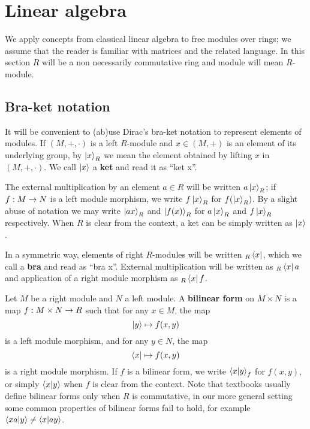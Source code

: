 \section{Linear algebra}
\label{sec:linear-algebra}

We apply concepts from classical linear algebra to free modules over
rings; we assume that the reader is familiar with matrices and the
related language. In this section $R$ will be a non necessarily
commutative ring and module will mean $R$-module.

\subsection{Bra-ket notation}
\label{sec:linear-algebra:bra-ket}

It will be convenient to (ab)use Dirac's
bra-ket notation to represent elements of
modules. If $(M,+,\cdot)$ is a left $R$-module and $x\in (M,+)$ is an
element of its underlying group, by $\left\lvert x \right\rangle_R$ we mean the element
obtained by lifting $x$ in $(M,+,\cdot)$. We call $\left\lvert x \right\rangle$ a
\textbf{ket} and read it as ``ket x''.

The external multiplication by an element $a\in R$ will be written
$a\left\lvert x \right\rangle_R$; if $f:M\rightarrow N$ is a left module morphism, we write
$f\left\lvert x \right\rangle_R$ for $f(\left\lvert x \right\rangle_R)$. By a slight abuse of notation we may
write $\left\lvert a x \right\rangle_R$ and $\left\lvert f(x) \right\rangle_R$ for $a\left\lvert x \right\rangle_R$ and
$f\left\lvert x \right\rangle_R$ respectively. When $R$ is clear from the context, a ket
can be simply written as $\left\lvert x \right\rangle$.

In a symmetric way, elements of right $R$-modules will be written
${}_R\left\langle x \right\rvert$, which we call a \textbf{bra} and read as
``bra x''. External multiplication will be written as ${}_R\left\langle x \right\rvert a$
and application of a right module morphism as ${}_R\left\langle x \right\rvert f$.

Let $M$ be a right module and $N$ a left module. A
\textbf{bilinear form} on $M\times N$ is a map
$f:M\times N\rightarrow R$ such that for any $x\in M$, the map
\[\left\lvert y \right\rangle\mapsto f(x, y)\]
is a left module morphism, and for any $y\in N$, the map
\[\left\langle x \right\rvert\mapsto f(x, y)\]
is a right module morphism. If $f$ is a bilinear form, we write
$\left\langle x \middle| y \right\rangle_f$ for $f(x,y)$, or simply $\left\langle x \middle| y \right\rangle$
when $f$ is clear from the context. Note that textbooks usually define
bilinear forms only when $R$ is commutative, in our more general
setting some common properties of bilinear forms fail to hold,
for example $\left\langle xa \middle| y \right\rangle\ne\left\langle x \middle| ay \right\rangle$.

